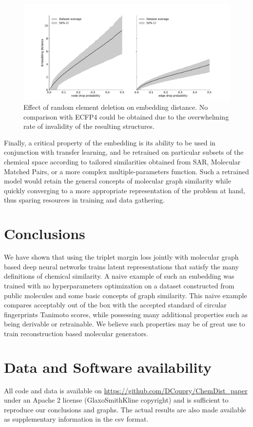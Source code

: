 \documentclass[journal=jacsat,manuscript=article]{achemso}
\begin{document}
\begin{figure}[hbtp]
\centering
\includegraphics[width=\textwidth]{data/Ablations.pdf}
\caption{Effect of random element deletion on embedding distance. No comparison with ECFP4 could be obtained due to the overwhelming rate of invalidity of the resulting structures.}
\label{fig:Ablations}
\end{figure}

Finally, a critical property of the embedding is its ability to be used in conjunction with transfer learning\cite{tan2018survey, weiss2016survey}, and be retrained on particular subsets of the chemical space according to tailored similarities obtained from SAR, Molecular Matched Pairs\cite{griffen2011matched}, or a more complex multiple-parameters function. Such a retrained model would retain the general concepts of molecular graph similarity while quickly converging to a more appropriate representation of the problem at hand, thus sparing resources in training and data gathering.

\section{Conclusions}\label{conclusions}
We have shown that using the triplet margin loss jointly with molecular graph based deep neural networks trains latent representations that satisfy the many definitions of chemical similarity. A naive example of such an embedding was trained with no hyperparameters optimization on a dataset constructed from public molecules and some basic concepts of graph similarity. This naive example compares acceptably out of the box with the accepted standard of circular fingerprints Tanimoto scores, while possessing many additional properties such as being derivable or retrainable. We believe such properties may be of great use to train reconstruction based molecular generators. 

\section{Data and Software availability}
All code and data is available on \href{https://github.com/DCoupry/ChemDist\_paper}{https://github.com/DCoupry/ChemDist\_paper} under an Apache 2 license (GlaxoSmithKline copyright) and is sufficient to reproduce our conclusions and graphs. The actual results are also made available as supplementary information in the csv format.
\end{document}
